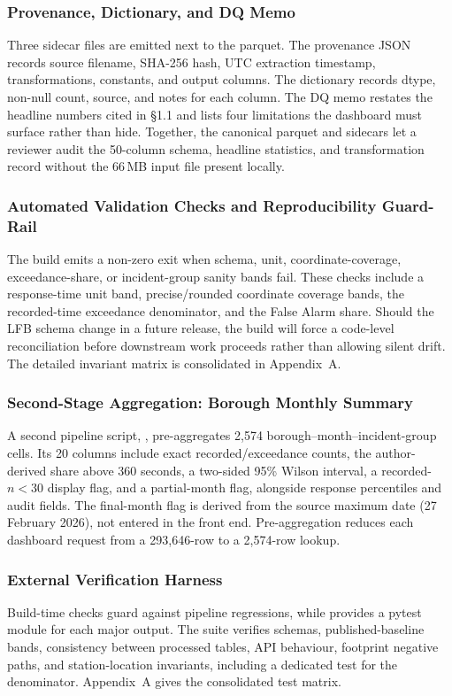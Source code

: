 \subsubsection{Provenance, Dictionary, and DQ Memo}
Three sidecar files are emitted next to the parquet. The provenance JSON records source filename, SHA-256 hash, UTC extraction timestamp, transformations, constants, and output columns. The dictionary records dtype, non-null count, source, and notes for each column. The DQ memo restates the headline numbers cited in \S1.1 and lists four limitations the dashboard must surface rather than hide. Together, the canonical parquet and sidecars let a reviewer audit the 50-column schema, headline statistics, and transformation record without the 66\,MB input file present locally.

\subsubsection{Automated Validation Checks and Reproducibility Guard-Rail}
The build emits a non-zero exit when schema, unit, coordinate-coverage, exceedance-share, or incident-group sanity bands fail. These checks include a response-time unit band, precise/rounded coordinate coverage bands, the recorded-time exceedance denominator, and the False Alarm share. Should the LFB schema change in a future release, the build will force a code-level reconciliation before downstream work proceeds rather than allowing silent drift. The detailed invariant matrix is consolidated in Appendix~A.

\subsubsection{Second-Stage Aggregation: Borough Monthly Summary}
A second pipeline script, , pre-aggregates 2{,}574 borough--month--incident-group cells. Its 20 columns include exact recorded/exceedance counts, the author-derived share above 360 seconds, a two-sided 95\% Wilson interval, a recorded-$n<30$ display flag, and a partial-month flag, alongside response percentiles and audit fields. The final-month flag is derived from the source maximum date (27 February 2026), not entered in the front end. Pre-aggregation reduces each dashboard request from a 293{,}646-row  to a 2{,}574-row lookup.

\subsubsection{External Verification Harness}
Build-time checks guard against pipeline regressions, while  provides a pytest module for each major output. The suite verifies schemas, published-baseline bands, consistency between processed tables, API behaviour, footprint negative paths, and station-location invariants, including a dedicated test for the  denominator. Appendix~A gives the consolidated test matrix.

